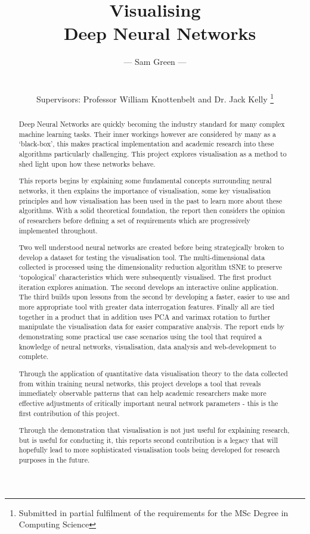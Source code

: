 \documentclass[a4paper,11pt,titlepage]{article}
\date{\displaydate{date}}
\title{Visualising 
		\\\ Deep Neural Networks
		}
\author{
 \Large{--- Sam Green ---}
 \\
 \\
 \\
 \small{Supervisors: Professor William Knottenbelt and Dr. Jack Kelly}
\thanks{Submitted in partial fulfilment of the requirements for the MSc Degree in Computing Science}
}
\begin{document}
\onehalfspacing

\maketitle

\clearpage
\clearpage
\thispagestyle{plain}
\null\newpage

\begin{abstract}
Deep Neural Networks are quickly becoming the industry standard for many complex machine learning tasks. Their inner workings however are considered by many as a `black-box', this makes practical implementation and academic research into these algorithms particularly challenging. This project explores visualisation as a method to shed light upon how these networks behave. 
\par 
This reports begins by explaining some fundamental concepts surrounding neural networks, it then explains the importance of visualisation, some key visualisation principles and how visualisation has been used in the past to learn more about these algorithms. With a solid theoretical foundation, the report then considers the opinion of researchers before defining a set of requirements which are progressively implemented throughout.
\par 
Two well understood neural networks are created before being strategically broken to develop a dataset for testing the visualisation tool. The multi-dimensional data collected is processed using the dimensionality reduction algorithm tSNE to preserve `topological' characteristics which were subsequently visualised.
The first product iteration explores animation. The second develops an interactive online application. The third builds upon lessons from the second by developing a faster, easier to use and more appropriate tool with greater data interrogation features. Finally all are tied together in a product that in addition uses PCA and varimax rotation to further manipulate the visualisation data for easier comparative analysis. The report ends by demonstrating some practical use case scenarios using the tool that required a knowledge of neural networks, visualisation, data analysis and web-development to complete.
\par 
Through the application of quantitative data visualisation theory to the data collected from within training neural networks, this project develops a tool that reveals immediately observable patterns that can help academic researchers make more effective adjustments of critically important neural network parameters - this is the first contribution of this project.
\par 
Through the demonstration that visualisation is not just useful for explaining research, but is useful for conducting it, this reports second contribution is a legacy that will hopefully lead to more sophisticated visualisation tools being developed for research purposes in the future.

\end{abstract}
\end{document}
